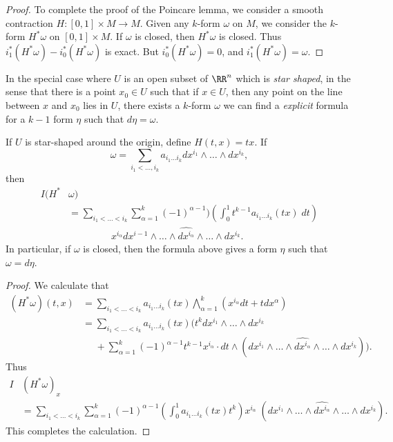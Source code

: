 \begin{proof}
    To complete the proof of the Poincare lemma, we consider a smooth contraction $H: [0,1] \times M \to M$. Given any $k$-form $\omega$ on $M$, we consider the $k$-form $H^* \omega$ on $[0,1] \times M$. If $\omega$ is closed, then $H^* \omega$ is closed. Thus $i_1^*(H^* \omega) - i_0^*(H^* \omega)$ is exact. But $i_0^*(H^* \omega) = 0$, and $i_1^*(H^* \omega) = \omega$.
\end{proof}

In the special case where $U$ is an open subset of $\RR^n$ which is \emph{star shaped}, in the sense that there is a point $x_0 \in U$ such that if $x \in U$, then any point on the line between $x$ and $x_0$ lies in $U$,  there exists a $k$-form $\omega$ we can find a \emph{explicit} formula for a $k-1$ form $\eta$ such that $d\eta = \omega$.

\begin{theorem}
    If $U$ is star-shaped around the origin, define $H(t,x) = tx$. If
    \[ \omega = \sum_{i_1 < \dots , i_k} a_{i_1 \dots i_k} dx^{i_1} \wedge \dots \wedge dx^{i_k}, \]
    then
    \begin{align*}
        I(H^*& \omega)\\
        &= \sum_{i_1 < \dots < i_k} \sum_{\alpha = 1}^k (-1)^{\alpha - 1}) \left( \int_0^1 t^{k-1} a_{i_1 \dots i_k}(tx)\; dt \right)\\
        &\ \ \ \ \ \ \ \ \ \ \ \ \ \ \ \ \ \ \ \ x^{i_\alpha} dx^{i-1} \wedge \dots \wedge \widehat{dx^{i_\alpha}} \wedge \dots \wedge dx^{i_k}.
    \end{align*}
    In particular, if $\omega$ is closed, then the formula above gives a form $\eta$ such that $\omega = d\eta$.
\end{theorem}
\begin{proof}
    We calculate that
    \begin{align*}
        (H^* \omega)(t,x) &= \sum_{i_1 < \dots < i_k} a_{i_1 \dots i_k}(tx) \bigwedge_{\alpha = 1}^k (x^{i_\alpha} dt + t dx^\alpha)\\
        &= \sum_{i_1 < \dots < i_k} a_{i_1 \dots i_k}(tx) \Big( t^k dx^{i_1} \wedge \dots \wedge dx^{i_k}\\
        &\ \ \ \ \ \ + \sum_{\alpha = 1}^k (-1)^{\alpha - 1} t^{k-1} x^{i_\alpha} \cdot dt \wedge (dx^{i_1} \wedge \dots \wedge \widehat{dx^{i_\alpha}} \wedge \dots \wedge dx^{i_k}) \Big).
    \end{align*}
    Thus
    \begin{align*}
        I&(H^* \omega)_x
        \\ &= \sum_{i_1 < \dots < i_k} \sum_{\alpha = 1}^k (-1)^{\alpha - 1} \left( \int_0^1 a_{i_1 \dots i_k}(tx) t^k \right) x^{i_\alpha}\; (dx^{i_1} \wedge \dots \wedge \widehat{dx^{i_\alpha}} \wedge \dots \wedge dx^{i_k}).
    \end{align*}
    This completes the calculation.
\end{proof}

